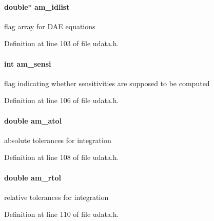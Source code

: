 \paragraph[{am\+\_\+idlist}]{\setlength{\rightskip}{0pt plus 5cm}double$\ast$ am\+\_\+idlist}\label{struct_user_data_ab62bd78b1593ddbf3d854356b4dcaa0f}
flag array for D\+A\+E equations 

Definition at line 103 of file udata.\+h.

\hypertarget{struct_user_data_a3bd631d595b8a864de83f25a1756ce3d}{}
\paragraph[{am\+\_\+sensi}]{\setlength{\rightskip}{0pt plus 5cm}int am\+\_\+sensi}\label{struct_user_data_a3bd631d595b8a864de83f25a1756ce3d}
flag indicating whether sensitivities are supposed to be computed 

Definition at line 106 of file udata.\+h.

\hypertarget{struct_user_data_a2aade90998d7e2cefa7953d4fdbc438b}{}
\paragraph[{am\+\_\+atol}]{\setlength{\rightskip}{0pt plus 5cm}double am\+\_\+atol}\label{struct_user_data_a2aade90998d7e2cefa7953d4fdbc438b}
absolute tolerances for integration 

Definition at line 108 of file udata.\+h.

\hypertarget{struct_user_data_a2370b78f280747d84a69619ea8c55985}{}
\paragraph[{am\+\_\+rtol}]{\setlength{\rightskip}{0pt plus 5cm}double am\+\_\+rtol}\label{struct_user_data_a2370b78f280747d84a69619ea8c55985}
relative tolerances for integration 

Definition at line 110 of file udata.\+h.

\hypertarget{struct_user_data_a0187950731c16f2857d0cd5b92416352}{}
